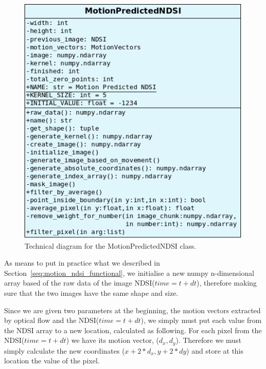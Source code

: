 \documentclass[11pt, a4paper]{report}
\begin{document}
	\begin{figure}[h!]
		\centering
		\includegraphics[scale=0.6]{../images/motion_created_diagram.png}
		\caption{Technical diagram for the MotionPredictedNDSI class.}
		\label{fig:motion_predicted_diagram}
	\end{figure}
	
	As means to put in practice what we described in Section~\ref{seq:motion_ndsi_functional}, we initialise a new numpy n-dimensional array based of the raw data of the image NDSI(\(time=t+dt\)), therefore making sure that the two images have the same shape and size.
	
	Since we are given two parameters at the beginning, the motion vectors extracted by optical flow and the NDSI(\(time=t+dt\)), we simply must put each value from the NDSI array to a new location, calculated as following. For each pixel from the NDSI(\(time=t+dt\)) we have its motion vector, (\(d_x, d_y\)). Therefore we must simply calculate the new coordinates (\(x + 2*d_x, y + 2*dy\)) and store at this location the value of the pixel.
\end{document}
